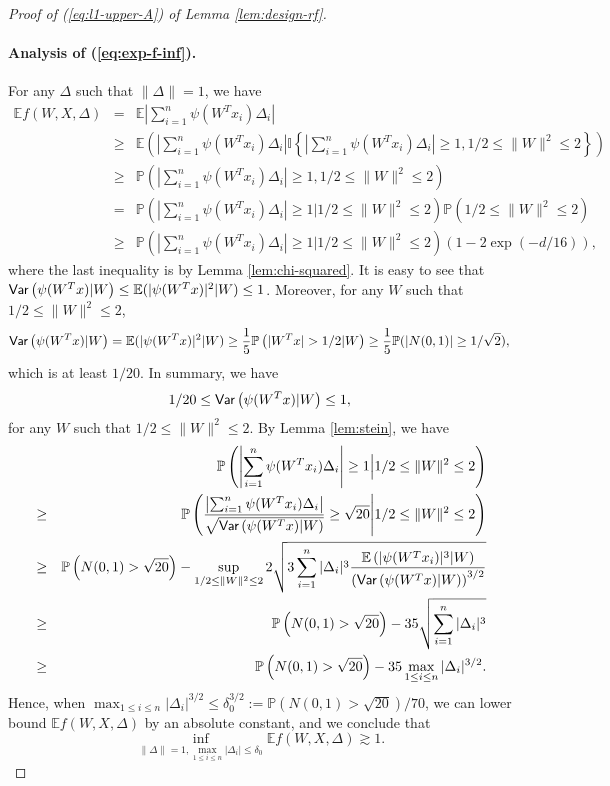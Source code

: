 \begin{proof}[Proof of (\ref{eq:l1-upper-A}) of Lemma \ref{lem:design-rf}]
\paragraph{Analysis of (\ref{eq:exp-f-inf}).} For any $\Delta$ such that $\|\Delta\|=1$, we have
\begin{eqnarray}
\nonumber \mathbb{E}f(W,X,\Delta) &=& \mathbb{E}\left|\sum_{i=1}^n\psi(W^Tx_i)\Delta_i\right| \\
\nonumber &\geq& \mathbb{E}\left(\left|\sum_{i=1}^n\psi(W^Tx_i)\Delta_i\right|\mathbb{I}\left\{\left|\sum_{i=1}^n\psi(W^Tx_i)\Delta_i\right|\geq 1, 1/2\leq \|W\|^2\leq 2\right\}\right) \\
\nonumber &\geq& \mathbb{P}\left(\left|\sum_{i=1}^n\psi(W^Tx_i)\Delta_i\right|\geq 1, 1/2\leq \|W\|^2\leq 2\right) \\
\nonumber &=& \mathbb{P}\left(\left|\sum_{i=1}^n\psi(W^Tx_i)\Delta_i\right|\geq 1\Big|1/2\leq \|W\|^2\leq 2\right)\mathbb{P}\left(1/2\leq \|W\|^2\leq 2\right) \\
\nonumber &\geq& \mathbb{P}\left(\left|\sum_{i=1}^n\psi(W^Tx_i)\Delta_i\right|\geq 1\Big|1/2\leq \|W\|^2\leq 2\right)\left(1-2\exp(-d/16)\right),
\end{eqnarray}
where the last inequality is by Lemma \ref{lem:chi-squared}. It is easy to see that $\textsf{Var}\left(\psi(W^Tx)|W\right)\leq \mathbb{E}(|\psi(W^Tx)|^2|W)\leq 1$. Moreover, for any $W$ such that $1/2\leq \|W\|^2\leq 2$, 
$$\Var\left(\psi(W^Tx)|W\right)= \mathbb{E}(|\psi(W^Tx)|^2|W) \geq \frac{1}{5}\mathbb{P}\left(|W^Tx|>1/2|W\right)\geq \frac{1}{5}\mathbb{P}(|N(0,1)|\geq 1/\sqrt{2}),$$
which is at least $1/20$. In summary, we have
$$1/20 \leq \textsf{Var}\left(\psi(W^Tx)|W\right) \leq 1,$$
for any $W$ such that $1/2\leq \|W\|^2\leq 2$.
By Lemma \ref{lem:stein}, we have
\begin{eqnarray}
\nonumber && \mathbb{P}\left(\left|\sum_{i=1}^n\psi(W^Tx_i)\Delta_i\right|\geq 1\Big|1/2\leq \|W\|^2\leq 2\right) \\
\nonumber &\geq& \mathbb{P}\left(\frac{\left|\sum_{i=1}^n\psi(W^Tx_i)\Delta_i\right|}{\sqrt{\Var\left(\psi(W^Tx)|W\right)}}\geq \sqrt{20}\Bigg|1/2\leq \|W\|^2\leq 2\right) \\
\nonumber &\geq& \mathbb{P}\left(N(0,1)>\sqrt{20}\right) - \sup_{1/2\leq \|W\|^2\leq 2} 2\sqrt{3\sum_{i=1}^n|\Delta_i|^3\frac{\mathbb{E}\left(|\psi(W^Tx_i)|^3|W\right)}{\left(\Var\left(\psi(W^Tx)|W\right)\right)^{3/2}}} \\
\nonumber &\geq& \mathbb{P}\left(N(0,1)>\sqrt{20}\right) - 35\sqrt{\sum_{i=1}^n|\Delta_i|^3} \\
\nonumber &\geq& \mathbb{P}\left(N(0,1)>\sqrt{20}\right) - 35\max_{1\leq i\leq n}|\Delta_i|^{3/2}.
\end{eqnarray}
Hence, when $\max_{1\leq i\leq n}|\Delta_i|^{3/2}\leq \delta_0^{3/2}:=\mathbb{P}\left(N(0,1)>\sqrt{20}\right)/70$, we can lower bound $\mathbb{E}f(W,X,\Delta)$ by an absolute constant, and we conclude that
\begin{equation}
\inf_{\|\Delta\|=1, \max_{1\leq i\leq n}|\Delta_i|\leq\delta_0}\mathbb{E}f(W,X,\Delta) \gtrsim 1.\label{eq:l1-1-2}
\end{equation}


\end{proof}
